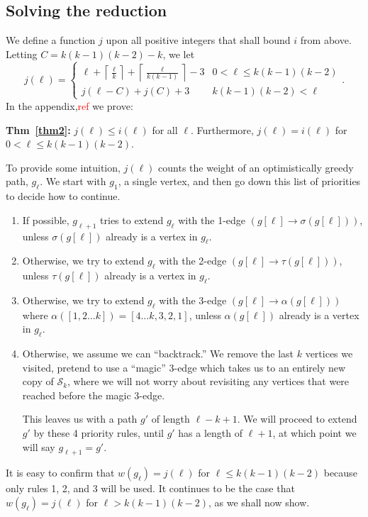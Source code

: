 \documentclass{article}
\theoremstyle{definition}
\newcommand{\edit}[1]{\textcolor{red}{#1}}
\begin{document}
\subsection{Solving the reduction} \label{solving reduction}

We define a function $j$ upon all positive integers that shall bound $i$ from above. Letting $C = k(k-1)(k-2)-k$, we let
\[j(\ell) = \begin{cases} 
\ell + \left\lceil \frac{\ell}{k}\right\rceil + \left\lceil \frac{\ell}{k(k-1)}\right\rceil -3 & 0 < \ell \leq k(k-1)(k-2)\\
j(\ell-C) + j(C)+3 & k(k-1)(k-2) < \ell
\end{cases} .\]In the appendix,\edit{ref} we prove:

\textbf{Thm~\ref*{thm2}:} $j(\ell) \leq i(\ell)$ for all $\ell$. Furthermore, $j(\ell) = i(\ell)$ for $0 < \ell \leq k(k-1)(k-2)$.

To provide some intuition, $j(\ell)$ counts the weight of an optimistically greedy path, $g_\ell$. We start with $g_1$, a single vertex, and then go down this list of priorities to decide how to continue.

\begin{enumerate}
    \item If possible, $g_{\ell+1}$ tries to extend $g_\ell$ with the 1-edge $(g[\ell]\to\sigma(g[\ell]))$, unless $\sigma(g[\ell])$ already is a vertex in $g_\ell$.
    \item Otherwise, we try to extend $g_\ell$ with the 2-edge $(g[\ell]\to\tau(g[\ell]))$, unless $\tau(g[\ell])$ already is a vertex in $g_\ell$.
    \item Otherwise, we try to extend $g_\ell$ with the 3-edge $(g[\ell]\to \alpha(g[\ell]))$ where $\alpha([1,2\dots k]) = [4\dots k, 3,2,1]$, unless $\alpha(g[\ell])$ already is a vertex in $g_\ell$.
    \item Otherwise, we assume we can ``backtrack.'' We remove the last $k$ vertices we visited, pretend to use a ``magic'' 3-edge which takes us to an entirely new copy of $\mathcal{S}_k$, where we will not worry about revisiting any vertices that were reached before the magic 3-edge. 
    
    This leaves us with a path $g'$ of length $\ell-k+1$. We will proceed to extend $g'$ by these 4 priority rules, until $g'$ has a length of $\ell+1$, at which point we will say $g_{\ell+1} = g'$.
\end{enumerate} 

It is easy to confirm that $w(g_\ell)= j(\ell)$ for $\ell \leq k(k-1)(k-2)$ because only rules 1, 2, and 3  will be used. It continues to be the case that $w(g_{\ell}) = j(\ell)$ for $\ell > k(k-1)(k-2)$, as we shall now show.
\end{document}
